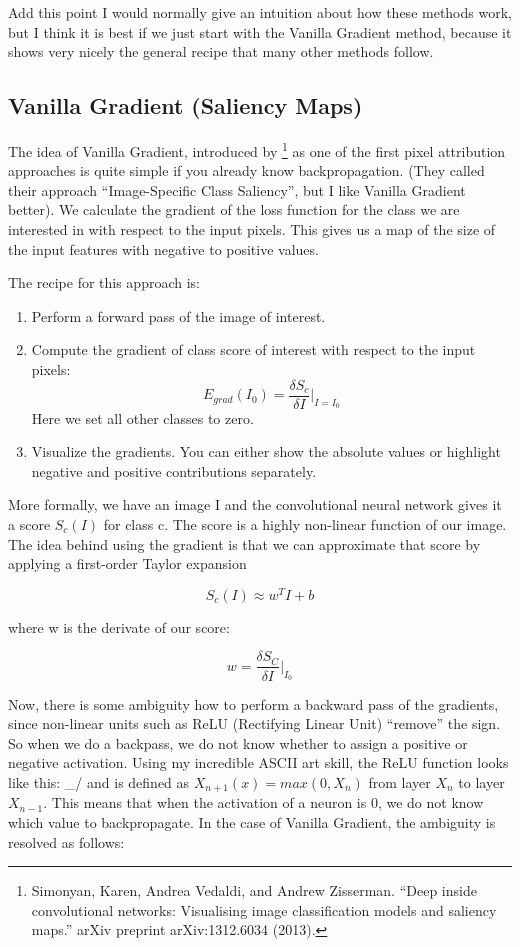 \documentclass[12pt,]{krantz}
\providecommand{\tightlist}{%
  \setlength{\itemsep}{0pt}\setlength{\parskip}{0pt}}
\begin{document}
Add this point I would normally give an intuition about how these
methods work, but I think it is best if we just start with the Vanilla
Gradient method, because it shows very nicely the general recipe that
many other methods follow.

\subsection{Vanilla Gradient (Saliency
Maps)}\label{vanilla-gradient-saliency-maps}

The idea of Vanilla Gradient, introduced by \footnote{Simonyan, Karen,
  Andrea Vedaldi, and Andrew Zisserman. ``Deep inside convolutional
  networks: Visualising image classification models and saliency maps.''
  arXiv preprint arXiv:1312.6034 (2013).} as one of the first pixel
attribution approaches is quite simple if you already know
backpropagation. (They called their approach ``Image-Specific Class
Saliency'', but I like Vanilla Gradient better). We calculate the
gradient of the loss function for the class we are interested in with
respect to the input pixels. This gives us a map of the size of the
input features with negative to positive values.

The recipe for this approach is:

\begin{enumerate}
\def\labelenumi{\arabic{enumi}.}
\tightlist
\item
  Perform a forward pass of the image of interest.
\item
  Compute the gradient of class score of interest with respect to the
  input pixels: \[E_{grad}(I_0)=\frac{\delta{}S_c}{\delta{}I}|_{I=I_0}\]
  Here we set all other classes to zero.
\item
  Visualize the gradients. You can either show the absolute values or
  highlight negative and positive contributions separately.
\end{enumerate}

More formally, we have an image I and the convolutional neural network
gives it a score \(S_c(I)\) for class c. The score is a highly
non-linear function of our image. The idea behind using the gradient is
that we can approximate that score by applying a first-order Taylor
expansion

\[S_c(I)\approx{}w^T{}I+b\]

where w is the derivate of our score:

\[w = \frac{\delta S_C}{\delta I}|_{I_0}\]

Now, there is some ambiguity how to perform a backward pass of the
gradients, since non-linear units such as ReLU (Rectifying Linear Unit)
``remove'' the sign. So when we do a backpass, we do not know whether to
assign a positive or negative activation. Using my incredible ASCII art
skill, the ReLU function looks like this: \_/ and is defined as
\(X_{n+1}(x)=max(0,X_n)\) from layer \(X_n\) to layer \(X_{n-1}\). This
means that when the activation of a neuron is 0, we do not know which
value to backpropagate. In the case of Vanilla Gradient, the ambiguity
is resolved as follows:
\end{document}
